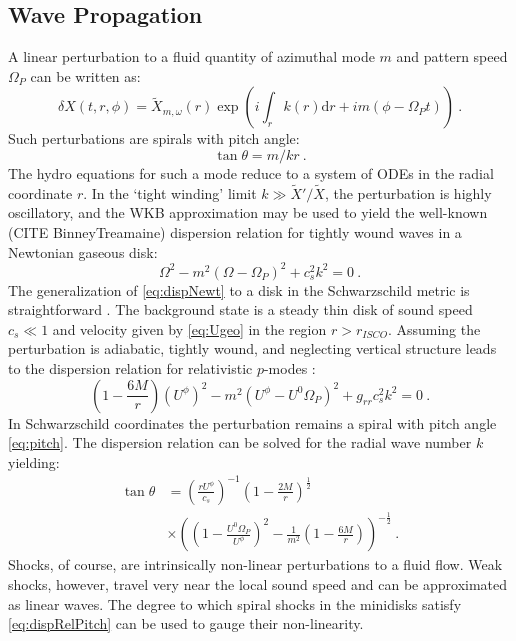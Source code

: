 \documentclass{emulateapj}
\newcommand{\dd}{\mbox{d}}
\begin{document}
\subsection{Wave Propagation}

A linear perturbation to a fluid quantity of azimuthal mode $m$ and pattern speed $\Omega_P$ can be written as:
\begin{equation}
	\delta X(t, r, \phi) = \tilde{X}_{m,\omega}(r) \exp \left( i \int_r k(r) \dd r  + i m (\phi - \Omega_P t) \right)\ . \label{eq:pert}
\end{equation}
Such perturbations are spirals with pitch angle:
\begin{equation}
	\tan \theta = m / k r \ . \label{eq:pitch}
\end{equation}
The hydro equations for such a mode reduce to a system of ODEs in the radial coordinate $r$.  In the `tight winding' limit $k \gg \tilde{X}'/\tilde{X}$, the perturbation is highly oscillatory, and the WKB approximation may be used to yield the well-known (CITE BinneyTreamaine) dispersion relation for tightly wound waves in a Newtonian gaseous disk:
\begin{equation}
	\Omega^2 - m^2(\Omega-\Omega_P)^2 + c_s^2 k^2 = 0 \ . \label{eq:dispNewt}
\end{equation}
The generalization of \eqref{eq:dispNewt} to a disk in the Schwarzschild metric is straightforward \citep{Perez97}.  The background state is a steady thin disk of sound speed $c_s \ll 1$ and velocity given by \eqref{eq:Ugeo} in the region $r > r_{ISCO}$.  Assuming the perturbation is adiabatic, tightly wound, and neglecting vertical structure leads to the dispersion relation for relativistic $p$-modes \citep{Abramowicz13}:
\begin{equation}
	\left(1-\frac{6M}{r} \right)\left(U^\phi\right)^2 - m^2(U^\phi-U^0\Omega_P)^2 + g_{rr} c_s^2 k^2 = 0 \ . \label{eq:disprel}
\end{equation}
In Schwarzschild coordinates the perturbation remains a spiral with pitch angle \eqref{eq:pitch}.  The dispersion relation can be solved for the radial wave number $k$ yielding:
\begin{align}
	\tan \theta &= \left( \frac{r U^\phi}{c_s} \right)^{-1} \left(1-\frac{2M}{r}\right)^{\frac{1}{2}} \label{eq:dispRelPitch} \\ \nonumber
		&\times \left(\left(1- \frac{U^0 \Omega_P}{U^\phi}\right)^2 - \frac{1}{m^2}\left(1-\frac{6M}{r}\right)\right)^{-\frac{1}{2}}\ . 
\end{align}
Shocks, of course, are intrinsically non-linear perturbations to a fluid flow.  Weak shocks, however, travel very near the local sound speed and can be approximated as linear waves.  The degree to which spiral shocks in the minidisks satisfy \eqref{eq:dispRelPitch} can be used to gauge their non-linearity.  
\end{document}
